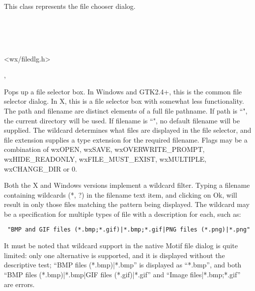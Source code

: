 \section{}\label{wxfiledialog}

This class represents the file chooser dialog.


\\
\\
\\


<wx/filedlg.h>


, 


Pops up a file selector box. In Windows and GTK2.4+, this is the common
file selector dialog. In X, this is a file selector box with somewhat less
functionality. The path and filename are distinct elements of a full file pathname.
If path is ``", the current directory will be used. If filename is ``",
no default filename will be supplied. The wildcard determines what files
are displayed in the file selector, and file extension supplies a type
extension for the required filename. Flags may be a combination of wxOPEN,
wxSAVE, wxOVERWRITE\_PROMPT, wxHIDE\_READONLY, wxFILE\_MUST\_EXIST,
wxMULTIPLE, wxCHANGE\_DIR or 0.

Both the X and Windows versions implement a wildcard filter. Typing a
filename containing wildcards (*, ?) in the filename text item, and
clicking on Ok, will result in only those files matching the pattern being
displayed. The wildcard may be a specification for multiple
types of file with a description for each, such as:

\begin{verbatim}
 "BMP and GIF files (*.bmp;*.gif)|*.bmp;*.gif|PNG files (*.png)|*.png"
\end{verbatim}

It must be noted that wildcard support in the native Motif file
dialog is quite limited: only one alternative is supported,
and it is displayed without the descriptive test; ``BMP files (*.bmp)|*.bmp''
is displayed as ``*.bmp'', and both
``BMP files (*.bmp)|*.bmp|GIF files (*.gif)|*.gif'' and
``Image files|*.bmp;*.gif'' are errors.

